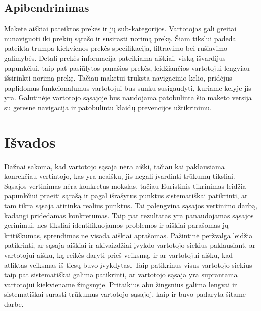 \documentclass[oneside]{VUMIFPSkursinis}
\begin{document}
\begin{center}
\begin{tabular}{ |p{4cm}| p{6cm} | p{7cm} | }
	
	
	
   \hline
    \end{tabular}
\end{center}

\pagebreak
	\subsection{Apibendrinimas}
Makete aiškiai pateiktos prekės ir jų sub-kategorijos. Vartotojas gali greitai nunaviguoti iki prekių sąrašo ir susirasti norimą prekę. Šiam tikslui padeda pateikta trumpa kiekvienos prekės specifikacija, filtravimo bei rušiavimo galimybės. Detali prekės informacija pateikiama aiškiai, viską išvardijus papunkčiui, taip pat pasiūlytos panašios prekės, leidžiančios vartotojui lengviau išsirinkti norimą prekę. Tačiau maketui trūksta navigacinio kelio, pridėjus paplidomus funkcionalumus vartotojui bus sunku susigaudyti, kuriame kelyje jis yra. Galutinėje vartotojo sąsajoje bus naudojama patobulinta šio maketo versija su geresne navigacija ir patobulintu klaidų prevencijos užtikrinimu.

\iffalse XXXXXXXXXXXXXXXXXXXXXXXXXXXXXXXXXXXXXXXXXXXXXXXXXXXXXXXXXXXXXXXXXXXXXXXXXXXXXXXXXXXXXXXXXXXXXXXXXXXXXXXXXXXXXXXXXXXXXXXXXXXXXXXXXXXXXXX \fi
\section{Išvados}
Dažnai sakoma, kad vartotojo sąsaja nėra aiški, tačiau kai paklausiama konrekčiau vertintojo, kas yra neaišku, jis negali įvardinti trūkumų tiksliai.
Sąsajos vertinimas nėra konkretus mokslas, tačiau Euristinis tikrinimas leidžia papunkčiui praeiti sąrašą ir pagal išrašytus punktus sistematiškai patikrinti, ar tam tikra sąsaja atitinka realius punktus.
Tai palengvina sąsajos vertinimo darbą, kadangi pridedamas konkretumas.
Taip pat rezultatas yra panaudojamas sąsajos gerinimui, nes tiksliai identifikuojamos problemos ir aiškiai parašomas jų kritiškumas, sprendimas ne visada aiškiai aprašomas.
\break
Pažintinė peržvalga leidžia patikrinti, ar sąsaja aiškiai ir akivaizdžiai įvykdo vartotojo siekius paklausiant, ar vartotojui aišku, ką reikės daryti prieš veiksmą, ir ar vartotojui aišku, kad atliktas veiksmas iš tiesų buvo įvykdytas.
Taip patikrinus visus vartotojo siekius taip pat sistematiškai galima patikrinti, ar vartotojo sąsaja yra suprantama vartotojui kiekviename žingsnyje.
\break
Pritaikius abu žingsnius galima lengvai ir sistematiškai surasti trūkumus vartotojo sąsajoj, kaip ir buvo padaryta šitame darbe.
\end{document}
